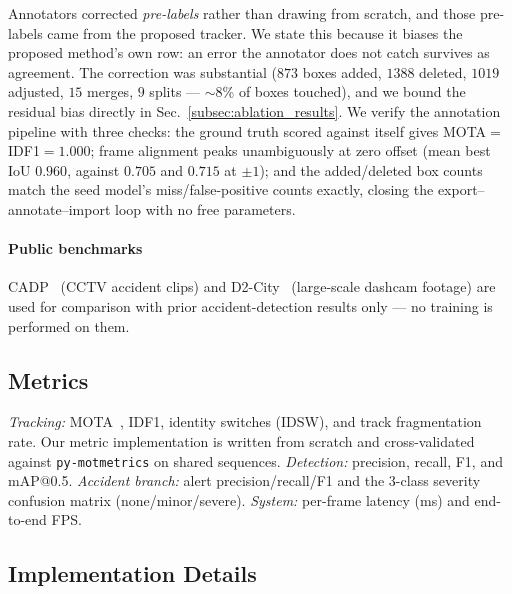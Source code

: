 Annotators corrected \emph{pre-labels} rather than drawing from scratch,
and those pre-labels came from the proposed tracker.
We state this because it biases the proposed method's own row: an error
the annotator does not catch survives as agreement.
The correction was substantial ($873$ boxes added, $1388$ deleted,
$1019$ adjusted, $15$ merges, $9$ splits --- $\sim$8\% of boxes
touched), and we bound the residual bias directly in
Sec.~\ref{subsec:ablation_results}.
We verify the annotation pipeline with three checks: the ground truth
scored against itself gives MOTA${=}$IDF1${=}1.000$; frame alignment
peaks unambiguously at zero offset (mean best IoU $0.960$, against
$0.705$ and $0.715$ at $\pm1$); and the added/deleted box counts match
the seed model's miss/false-positive counts exactly, closing the
export--annotate--import loop with no free parameters.

\paragraph{Public benchmarks}
CADP~\cite{Shah2018_cadp} (CCTV accident clips) and
D2-City~\cite{Che2019_d2city} (large-scale dashcam footage) are used
for comparison with prior accident-detection results only --- no
training is performed on them.

\subsection{Metrics}
\label{subsec:metrics}

\emph{Tracking:} MOTA~\cite{Bernardin2008_mota}, IDF1, identity
switches (IDSW), and track fragmentation rate.
Our metric implementation is written from scratch and cross-validated
against \texttt{py-motmetrics} on shared sequences.
\emph{Detection:} precision, recall, F1, and mAP@0.5.
\emph{Accident branch:} alert precision/recall/F1 and the 3-class
severity confusion matrix (none/minor/severe).
\emph{System:} per-frame latency (ms) and end-to-end FPS.

\subsection{Implementation Details}
\label{subsec:impl}

